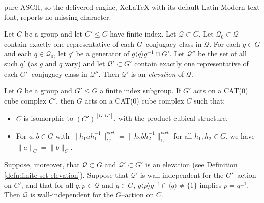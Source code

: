 \documentclass[10pt,a4paper]{amsart}
\begin{document}
pure ASCII, so the delivered engine, XeLaTeX with its default Latin Modern text font, reports no missing character.
\begin{defn}\label{defn:finite-set-elevation}
Let $G$ be a group and let $G'\leq G$ have finite index.  Let $\mathcal Q\subset G$.  Let $\mathcal Q_0\subset \mathcal Q$ contain exactly one representative of each $G$--conjugacy class in $\mathcal Q$.  For each $g\in G$ and each $q\in\mathcal Q_0$, let $q'$ be a generator of $g\langle q\rangle g^{-1}\cap G'$.  Let $\mathcal Q''$ be the set of all such $q'$ (as $g$ and $q$ vary) and let $\mathcal Q'\subset G'$ contain exactly one representative of each $G'$--conjugacy class in $\mathcal Q''$.  Then $\mathcal Q'$ is an \emph{elevation} of $\mathcal Q$.
\end{defn}

\begin{lem}\label{lem:star}
Let $G$ be a group and $G'\leq G$ a finite index subgroup.  If $G'$ acts on a CAT(0) cube complex $C'$, then $G$ acts on a CAT(0) cube complex $C$ such that:
\begin{itemize}
 \item $C$ is isomorphic to $(C')^{[G:G']}$, with the product cubical structure.
 
 \item For $a,b\in G$ with $\|h_1ah_1^{-1}\|_{C'}^{virt}=\|h_2bh_2^{-1}\|_{C'}^{virt}$ for all $h_1,h_2\in G$, we have $\|a\|_C=\|b\|_C$.
\end{itemize}

Suppose, moreover, that $\mathcal Q\subset G$ and $\mathcal Q'\subset G'$ is an elevation (see Definition \ref{defn:finite-set-elevation}).  Suppose that $\mathcal Q'$ is wall-independent for the $G'$--action on $C'$, and that for all $q,p\in\mathcal Q$ and $g\in G$, $g\langle p\rangle g^{-1}\cap \langle q\rangle\neq\{1\}$ implies $p=q^{\pm1}$. Then $\mathcal Q$ is wall-independent for the $G$--action on $C$.
\end{lem}
\end{document}
